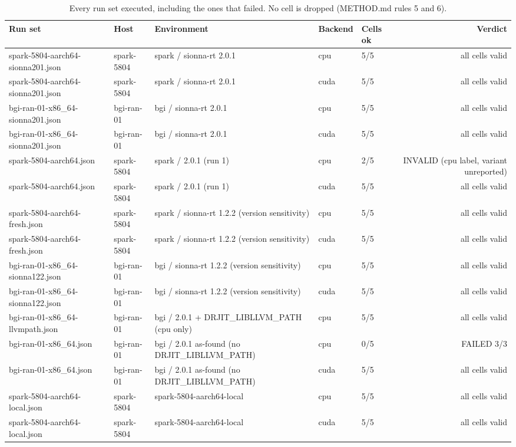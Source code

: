\begin{table}[t]
  \centering
  \caption{Every run set executed, including the ones that failed. No cell is dropped (METHOD.md rules 5 and 6).}
  \label{tab:environments}
  \begin{tabular}{lllllr}
    \toprule
    Run set & Host & Environment & Backend & Cells ok & Verdict \\
    \midrule
    spark-5804-aarch64-sionna201.json & spark-5804 & spark / sionna-rt 2.0.1 & cpu & 5/5 & all cells valid \\
    spark-5804-aarch64-sionna201.json & spark-5804 & spark / sionna-rt 2.0.1 & cuda & 5/5 & all cells valid \\
    bgi-ran-01-x86\_64-sionna201.json & bgi-ran-01 & bgi / sionna-rt 2.0.1 & cpu & 5/5 & all cells valid \\
    bgi-ran-01-x86\_64-sionna201.json & bgi-ran-01 & bgi / sionna-rt 2.0.1 & cuda & 5/5 & all cells valid \\
    spark-5804-aarch64.json & spark-5804 & spark / 2.0.1 (run 1) & cpu & 2/5 & INVALID (cpu label, variant unreported) \\
    spark-5804-aarch64.json & spark-5804 & spark / 2.0.1 (run 1) & cuda & 5/5 & all cells valid \\
    spark-5804-aarch64-fresh.json & spark-5804 & spark / sionna-rt 1.2.2 (version sensitivity) & cpu & 5/5 & all cells valid \\
    spark-5804-aarch64-fresh.json & spark-5804 & spark / sionna-rt 1.2.2 (version sensitivity) & cuda & 5/5 & all cells valid \\
    bgi-ran-01-x86\_64-sionna122.json & bgi-ran-01 & bgi / sionna-rt 1.2.2 (version sensitivity) & cpu & 5/5 & all cells valid \\
    bgi-ran-01-x86\_64-sionna122.json & bgi-ran-01 & bgi / sionna-rt 1.2.2 (version sensitivity) & cuda & 5/5 & all cells valid \\
    bgi-ran-01-x86\_64-llvmpath.json & bgi-ran-01 & bgi / 2.0.1 + DRJIT\_LIBLLVM\_PATH (cpu only) & cpu & 5/5 & all cells valid \\
    bgi-ran-01-x86\_64.json & bgi-ran-01 & bgi / 2.0.1 as-found (no DRJIT\_LIBLLVM\_PATH) & cpu & 0/5 & FAILED 3/3 \\
    bgi-ran-01-x86\_64.json & bgi-ran-01 & bgi / 2.0.1 as-found (no DRJIT\_LIBLLVM\_PATH) & cuda & 5/5 & all cells valid \\
    spark-5804-aarch64-local.json & spark-5804 & spark-5804-aarch64-local & cpu & 5/5 & all cells valid \\
    spark-5804-aarch64-local.json & spark-5804 & spark-5804-aarch64-local & cuda & 5/5 & all cells valid \\
    \bottomrule
  \end{tabular}
\end{table}
